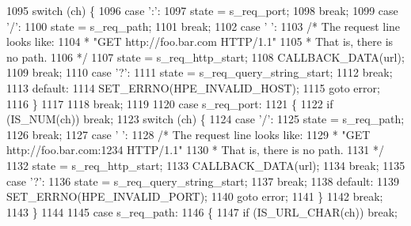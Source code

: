 \begin{DoxyCode}
1095         \textcolor{keywordflow}{switch} (ch) \{
1096           \textcolor{keywordflow}{case} \textcolor{charliteral}{':'}:
1097             state = s_req_port;
1098             \textcolor{keywordflow}{break};
1099           \textcolor{keywordflow}{case} \textcolor{charliteral}{'/'}:
1100             state = s_req_path;
1101             \textcolor{keywordflow}{break};
1102           \textcolor{keywordflow}{case} \textcolor{charliteral}{' '}:
1103             \textcolor{comment}{/* The request line looks like:}
1104 \textcolor{comment}{             *   "GET http://foo.bar.com HTTP/1.1"}
1105 \textcolor{comment}{             * That is, there is no path.}
1106 \textcolor{comment}{             */}
1107             state = s_req_http_start;
1108             CALLBACK_DATA(url);
1109             \textcolor{keywordflow}{break};
1110           \textcolor{keywordflow}{case} \textcolor{charliteral}{'?'}:
1111             state = s_req_query_string_start;
1112             \textcolor{keywordflow}{break};
1113           \textcolor{keywordflow}{default}:
1114             SET_ERRNO(HPE_INVALID_HOST);
1115             \textcolor{keywordflow}{goto} error;
1116         \}
1117 
1118         \textcolor{keywordflow}{break};
1119 
1120       \textcolor{keywordflow}{case} s_req_port:
1121       \{
1122         \textcolor{keywordflow}{if} (IS_NUM(ch)) \textcolor{keywordflow}{break};
1123         \textcolor{keywordflow}{switch} (ch) \{
1124           \textcolor{keywordflow}{case} \textcolor{charliteral}{'/'}:
1125             state = s_req_path;
1126             \textcolor{keywordflow}{break};
1127           \textcolor{keywordflow}{case} \textcolor{charliteral}{' '}:
1128             \textcolor{comment}{/* The request line looks like:}
1129 \textcolor{comment}{             *   "GET http://foo.bar.com:1234 HTTP/1.1"}
1130 \textcolor{comment}{             * That is, there is no path.}
1131 \textcolor{comment}{             */}
1132             state = s_req_http_start;
1133             CALLBACK_DATA(url);
1134             \textcolor{keywordflow}{break};
1135           \textcolor{keywordflow}{case} \textcolor{charliteral}{'?'}:
1136             state = s_req_query_string_start;
1137             \textcolor{keywordflow}{break};
1138           \textcolor{keywordflow}{default}:
1139             SET_ERRNO(HPE_INVALID_PORT);
1140             \textcolor{keywordflow}{goto} error;
1141         \}
1142         \textcolor{keywordflow}{break};
1143       \}
1144 
1145       \textcolor{keywordflow}{case} s_req_path:
1146       \{
1147         \textcolor{keywordflow}{if} (IS_URL_CHAR(ch)) \textcolor{keywordflow}{break};

\end{DoxyCode}

